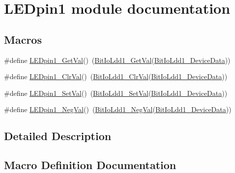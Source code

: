 \hypertarget{group___l_e_dpin1__module}{}\section{L\+E\+Dpin1 module documentation}
\label{group___l_e_dpin1__module}
\subsection*{Macros}
\begin{DoxyCompactItemize}
\item 
\#define \hyperlink{group___l_e_dpin1__module_ga452621fabd51a8ab50951b9d318dff24}{L\+E\+Dpin1\+\_\+\+Get\+Val}()~(\hyperlink{group___bit_io_ldd1__module_gab3360cb6abf61e5983bee6a39f337789}{Bit\+Io\+Ldd1\+\_\+\+Get\+Val}(\hyperlink{group___bit_io_ldd1__module_ga87620b3d6d232d352b6cd29d865efc18}{Bit\+Io\+Ldd1\+\_\+\+Device\+Data}))
\item 
\#define \hyperlink{group___l_e_dpin1__module_gaa8cd76132679a45d7b46009191d7c936}{L\+E\+Dpin1\+\_\+\+Clr\+Val}()~(\hyperlink{group___bit_io_ldd1__module_ga85c0f352eded8016d2e47bf13c10e14c}{Bit\+Io\+Ldd1\+\_\+\+Clr\+Val}(\hyperlink{group___bit_io_ldd1__module_ga87620b3d6d232d352b6cd29d865efc18}{Bit\+Io\+Ldd1\+\_\+\+Device\+Data}))
\item 
\#define \hyperlink{group___l_e_dpin1__module_ga9e387f81ae9dde5b8736c35d6d5002a9}{L\+E\+Dpin1\+\_\+\+Set\+Val}()~(\hyperlink{group___bit_io_ldd1__module_ga64282ec63632688f21f6b06477f48214}{Bit\+Io\+Ldd1\+\_\+\+Set\+Val}(\hyperlink{group___bit_io_ldd1__module_ga87620b3d6d232d352b6cd29d865efc18}{Bit\+Io\+Ldd1\+\_\+\+Device\+Data}))
\item 
\#define \hyperlink{group___l_e_dpin1__module_ga3efa3c36897f65f865e2b08cf6e205c4}{L\+E\+Dpin1\+\_\+\+Neg\+Val}()~(\hyperlink{group___bit_io_ldd1__module_ga6e66b99e22798dceaadbfffe984ce5d3}{Bit\+Io\+Ldd1\+\_\+\+Neg\+Val}(\hyperlink{group___bit_io_ldd1__module_ga87620b3d6d232d352b6cd29d865efc18}{Bit\+Io\+Ldd1\+\_\+\+Device\+Data}))
\end{DoxyCompactItemize}


\subsection{Detailed Description}


\subsection{Macro Definition Documentation}
\mbox{\label{group___l_e_dpin1__module_gaa8cd76132679a45d7b46009191d7c936}} 
